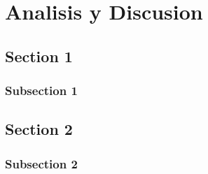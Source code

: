\chapter{Analisis y Discusion}
\label{ch4}

\section{Section 1}
    \subsection{Subsection 1}

\section{Section 2}
    \subsection{Subsection 2}